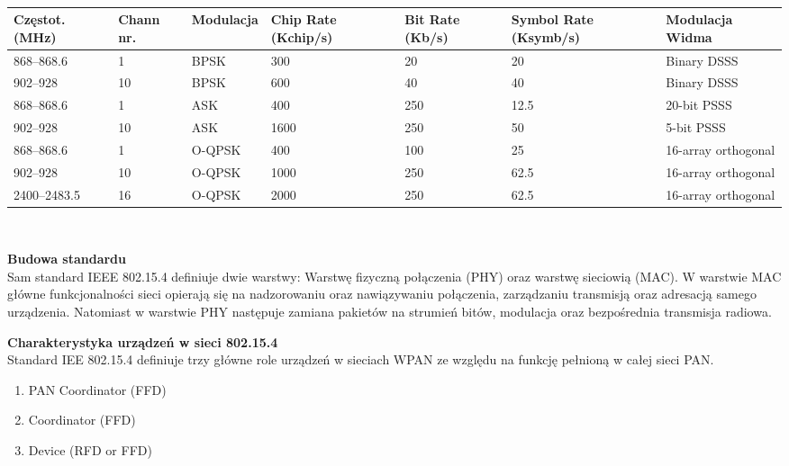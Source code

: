 \mbox{}\\
\begin{tabular}{ |p{2cm}||p{1.5cm}|p{1.5cm}|p{1.8cm}|p{1.8cm}|p{1.8cm}|p{3cm}|  }
 \hline
 Częstot. (MHz) & Chann nr. & Modulacja & Chip Rate (Kchip/s) & Bit Rate (Kb/s) & Symbol Rate (Ksymb/s) & Modulacja Widma \\
 \hline
868–868.6 & 1 & BPSK & 300 & 20 & 20 & Binary DSSS \\
 \hline
902–928 & 10 & BPSK & 600 & 40 & 40 & Binary DSSS \\
 \hline
868–868.6 & 1 & ASK & 400 & 250 & 12.5 & 20-bit PSSS \\
 \hline
902–928 & 10 & ASK & 1600 & 250 & 50 & 5-bit PSSS \\
 \hline
868–868.6 & 1 & O-QPSK & 400 & 100 & 25 & 16-array orthogonal \\
 \hline
902–928 & 10 & O-QPSK & 1000 & 250 & 62.5 & 16-array orthogonal \\
 \hline
2400–2483.5 & 16 & O-QPSK & 2000 & 250 & 62.5 & 16-array orthogonal \\

 \hline
\end{tabular}
\mbox{}\\

\par
\tab \textbf{Budowa standardu} \\
Sam standard IEEE 802.15.4 definiuje dwie warstwy: Warstwę fizyczną połączenia (PHY) oraz warstwę sieciowią (MAC). W warstwie MAC główne funkcjonalności sieci  opierają się na nadzorowaniu oraz nawiązywaniu połączenia, zarządzaniu transmisją oraz adresacją samego urządzenia. Natomiast w warstwie PHY następuje zamiana pakietów na strumień bitów, modulacja oraz bezpośrednia transmisja radiowa. \\

\par
\tab \textbf{Charakterystyka urządzeń w sieci 802.15.4} \\
Standard IEE 802.15.4 definiuje trzy główne role urządzeń w sieciach WPAN ze względu na funkcję pełnioną w całej sieci PAN.
\begin{enumerate}
	\item PAN Coordinator (FFD)
	\item Coordinator (FFD)
	\item Device (RFD or FFD)
\end{enumerate}  

\clearpage